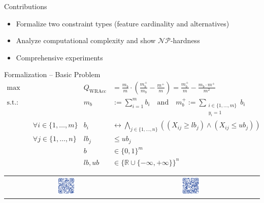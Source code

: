 \documentclass[USenglish]{article} %
\begin{document}
\begin{minipage}[t]{0.49\textwidth}
\begin{standardbox}{Contributions}
\begin{itemize}
			\item Formalize two constraint types (feature cardinality and alternatives)
			\item Analyze computational complexity and show $\mathcal{NP}$-hardness
			\item Comprehensive experiments
		\end{itemize}
	\end{standardbox}
	\vspace{10pt}
	\begin{standardbox}{Formalization -- Basic Problem}
		\begin{align*}
			\max &\quad & Q_{\text{WRAcc}} &= \frac{m_b}{m} \cdot \left( \frac{m_b^+}{m_b} - \frac{m^+}{m} \right) = \frac{m_b^+}{m} - \frac{m_b \cdot m^+}{m^2} \\
			\text{s.t.:} &\quad & m_b &:= \sum_{i=1}^{m} b_i \quad\text{and}\quad m_b^+ := \sum_{\substack{i \in \{1, \dots, m\} \\ y_i = 1 }} b_i \\
			&\quad \forall i \in \{1, \dots, m\} & b_i &\leftrightarrow \bigwedge_{j \in \{1, \dots, n\}} \left( \left( X_{ij} \geq \mathit{lb}_j \right) \land \left( X_{ij} \leq \mathit{ub}_j \right) \right) \\
			&\quad \forall j \in \{1, \dots, n\} & \mathit{lb}_j &\leq \mathit{ub}_j \\
			&\quad & b &\in \{0, 1\}^m \\
			&\quad & \mathit{lb}, \mathit{ub} &\in \{\mathbb{R} \cup \{-\infty, +\infty\}\}^n
		\end{align*}
	\end{standardbox}
	\vspace{10pt}
	\setlength{\tabcolsep}{80pt} %
	\centering
	\begin{tabular}{ccc} %
		\includegraphics[width=0.15\textwidth]{qr_codes/qr-code-paper.pdf} &
		\includegraphics[width=0.15\textwidth]{qr_codes/qr-code-github.pdf} &

\end{tabular}
\end{minipage}
\end{document}
